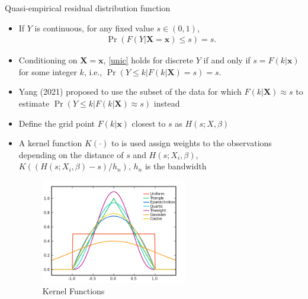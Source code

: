 \documentclass[
  ignorenonframetext,
]{beamer}
\providecommand{\tightlist}{%
  \setlength{\itemsep}{0pt}\setlength{\parskip}{0pt}}
\begin{document}
\begin{frame}{Quasi-empirical residual distribution function}
\protect\hypertarget{quasi-empirical-residual-distribution-function}{}
\begin{itemize}
\tightlist
\item
  If \(Y\) is continuous, for any fixed value \(s \in (0, 1)\),
  \begin{align}\label{unic}
    \Pr(F(Y|\mathbf{X}=\mathbf{x})\leq s)=s.
  \end{align}
\item
  Conditioning on \(\mathbf{X}=\mathbf{x}\), \eqref{unic} holds for
  discrete \(Y\) if and only if \(s=F(k| \mathbf{x})\) for some integer
  \(k\), i.e., \(\Pr \left(Y\leq k| F(k| \mathbf{X})=s\right)=s\).
\item
  Yang (2021) proposed to use the subset of the data for which
  \(F(k| \mathbf{X})\approx s\) to estimate
  \(\Pr(Y\leq k| F(k| \mathbf{X})\approx s)\) instead
\end{itemize}
\end{frame}

\begin{frame}{}
\protect\hypertarget{section-7}{}
\begin{itemize}
\tightlist
\item
  Define the grid point \(F(k| \mathbf{x})\) closest to \(s\) as
  \(H( s;X,\beta)\)
\item
  A kernel function \(K(\cdot)\) to is used assign weights to the
  observations depending on the distance of \(s\) and
  \(H( s;X_{i},\beta)\), \(K((H( s;X_{i},\beta)-s)/h_n)\), \(h_n\) is
  the bandwidth

  \begin{figure}[h]
          \centering
          \includegraphics[width=0.6\textwidth]{figures/Kernels}
          \caption{Kernel Functions}
      \end{figure}
\end{itemize}
\end{frame}
\end{document}
